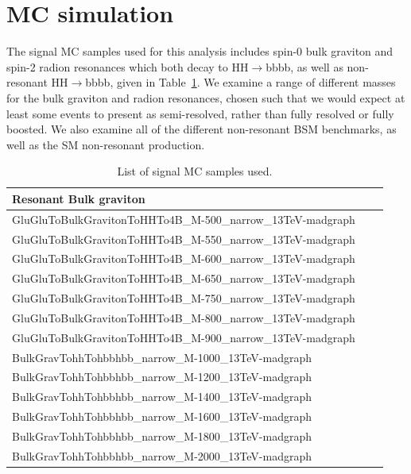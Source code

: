 \section{MC simulation\label{ss:MCSimulation}}

The signal MC samples used for this analysis includes spin-0 bulk graviton and spin-2 radion resonances which both decay to HH$\rightarrow$bbbb, as well as non-resonant HH$\rightarrow$bbbb, 
given in Table~\ref{tab:signal_MC}. We examine a range of different masses for the bulk graviton and radion resonances, chosen such that we would expect at least some events to present as semi-resolved, rather than fully resolved or fully boosted. We also examine all of the different non-resonant BSM benchmarks, as well as the SM non-resonant production.

\begin{table}[htb]
  \begin{center}
    \caption{List of signal MC samples used.\label{tab:signal_MC}}
    \begin{tabular}{|l|c|c}
      \hline
      \textbf{Resonant Bulk graviton} \\
      \hline
      {GluGluToBulkGravitonToHHTo4B\_M-500\_narrow\_13TeV-madgraph}  \\
      {GluGluToBulkGravitonToHHTo4B\_M-550\_narrow\_13TeV-madgraph} \\
      {GluGluToBulkGravitonToHHTo4B\_M-600\_narrow\_13TeV-madgraph} \\
      {GluGluToBulkGravitonToHHTo4B\_M-650\_narrow\_13TeV-madgraph}  \\
      {GluGluToBulkGravitonToHHTo4B\_M-750\_narrow\_13TeV-madgraph} \\
      {GluGluToBulkGravitonToHHTo4B\_M-800\_narrow\_13TeV-madgraph} \\
      {GluGluToBulkGravitonToHHTo4B\_M-900\_narrow\_13TeV-madgraph} \\
      {BulkGravTohhTohbbhbb\_narrow\_M-1000\_13TeV-madgraph}  \\
      {BulkGravTohhTohbbhbb\_narrow\_M-1200\_13TeV-madgraph}  \\
      {BulkGravTohhTohbbhbb\_narrow\_M-1400\_13TeV-madgraph}  \\
      {BulkGravTohhTohbbhbb\_narrow\_M-1600\_13TeV-madgraph} \\
      {BulkGravTohhTohbbhbb\_narrow\_M-1800\_13TeV-madgraph}\\
      {BulkGravTohhTohbbhbb\_narrow\_M-2000\_13TeV-madgraph} \\

\end{tabular}
\end{center}
\end{table}
